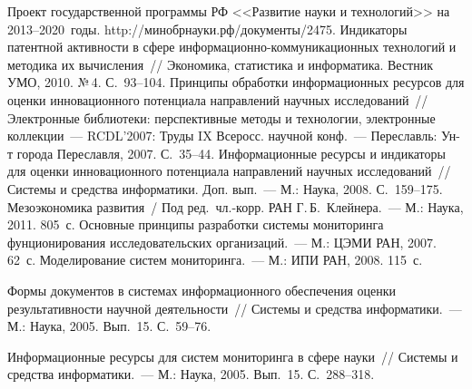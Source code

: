 \begin{multicols}{2}
{{\begin{thebibliography}{99}
Проект государственной программы РФ <<Развитие науки и технологий>> на 2013--2020~годы. {\sf 
http://\linebreak минобрнауки.рф/документы/2475}.
 Индикаторы патентной активности в сфере 
ин\-фор\-ма\-ци\-он\-но-ком\-му\-ни\-ка\-ци\-он\-ных технологий и методика их вычисления~// Экономика, статистика и 
информатика. Вестник УМО, 2010. №\,4. С.~93--104.
 Принципы обработки информационных ресурсов для оценки 
инновационного потенциала направлений научных исследований~// Электронные библиотеки: 
перспективные методы и технологии, электронные коллекции~--- RCDL'2007: Труды IX Всеросс. 
научной конф.~--- Переславль: Ун-т города Переславля, 2007. С.~35--44.
 Информационные ресурсы и индикаторы для оценки 
инновационного потенциала направлений научных исследований~// Системы и средства информатики. 
Доп. вып.~--- М.: Наука, 2008. С.~159--175.
Мезоэкономика развития~/ Под ред.\ чл.-корр. РАН Г.\,Б.~Клейнера.~--- М.: Наука, 2011. 805~с.
 Основные принципы разработки системы 
мониторинга фунционирования исследовательских организаций.~--- М.: ЦЭМИ РАН, 2007. 62~с.
Моделирование систем мониторинга.~--- М.: ИПИ РАН, 2008. 115~с.

 Формы документов в системах информационного обеспечения оценки 
результативности научной деятельности~// Системы и средства информатики.~--- М.: Наука, 2005. 
Вып.~15. С.~59--76.

 Информационные ресурсы для систем мониторинга в сфере науки~// Системы и 
средства информатики.~--- М.: Наука, 2005. Вып.~15. С.~288--318.


\end{thebibliography}}}
\end{multicols}
